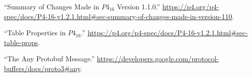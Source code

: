 \documentclass[11pt]{article}
\begin{document}
{{\begin{thebibliography}{40}
\mdbibitemlabel{{}[30]}\textquotedblleft{}Summary of Changes Made in $P4_{16}$ Version 1.1.0.\textquotedblright{} \href{https://p4.org/p4-spec/docs/P4-16-v1.2.1.html\%23sec-summary-of-changes-made-in-version-110}{{\ttfamily https://\hspace{0pt}p4.\hspace{0pt}org/\hspace{0pt}p4-\hspace{0pt}spec/\hspace{0pt}docs/\hspace{0pt}P4-\hspace{0pt}16-\hspace{0pt}v1.\hspace{0pt}2.\hspace{0pt}1.\hspace{0pt}html\#\hspace{0pt}sec-\hspace{0pt}summary-\hspace{0pt}of-\hspace{0pt}changes-\hspace{0pt}made-\hspace{0pt}in-\hspace{0pt}version-\hspace{0pt}110}}.\label{p4revisions110}%

\mdbibitemlabel{{}[31]}\textquotedblleft{}Table Properties in $P4_{16}$.\textquotedblright{} \href{https://p4.org/p4-spec/docs/P4-16-v1.2.1.html\%23sec-table-props}{{\ttfamily https://\hspace{0pt}p4.\hspace{0pt}org/\hspace{0pt}p4-\hspace{0pt}spec/\hspace{0pt}docs/\hspace{0pt}P4-\hspace{0pt}16-\hspace{0pt}v1.\hspace{0pt}2.\hspace{0pt}1.\hspace{0pt}html\#\hspace{0pt}sec-\hspace{0pt}table-\hspace{0pt}props}}.\label{p4tableproperties}%

\mdbibitemlabel{{}[32]}\textquotedblleft{}The Any Protobuf Message.\textquotedblright{} \href{https://developers.google.com/protocol-buffers/docs/proto3\%23any}{{\ttfamily https://\hspace{0pt}developers.\hspace{0pt}google.\hspace{0pt}com/\hspace{0pt}protocol-\hspace{0pt}buffers/\hspace{0pt}docs/\hspace{0pt}proto3\#\hspace{0pt}any}}.\label{protoany}%


\end{thebibliography}}}
\end{document}
